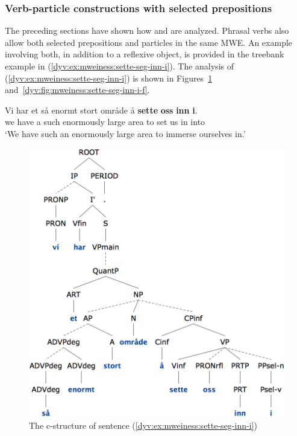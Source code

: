 \documentclass[output=paper]{langsci/langscibook}
\begin{document}
\subsubsection{Verb-particle constructions with selected prepositions}\label{dyv:sec:mweiness:prtprepverbs}

The preceding sections have shown how  and  are analyzed.
Phrasal verbs also allow both selected prepositions and particles in the same MWE.
An example involving both, in addition to a reflexive object, is provided in the treebank example in (\ref{dyv:ex:mweiness:sette-seg-inn-i}).
The analysis of (\ref{dyv:ex:mweiness:sette-seg-inn-i}) is shown in Figures~\ref{dyv:fig:mweiness:sette-seg-inn-i-c} and~\ref{dyv:fig:mweiness:sette-seg-inn-i-f}.

\ea\label{dyv:ex:mweiness:sette-seg-inn-i}
\gll Vi har et så enormt stort område å \textbf{sette} \textbf{oss} \textbf{inn} \textbf{i}.\\
     we have a such enormously large area to set us in into\\
\glt `We have such an enormously large area to immerse ourselves in.'
\z

\begin{figure}
  \includegraphics[height=.47\textheight]{figures/sette-seg-inn-i-c.png}
  \caption{The c-structure of sentence (\ref{dyv:ex:mweiness:sette-seg-inn-i})}
  \label{dyv:fig:mweiness:sette-seg-inn-i-c}
\end{figure}
\end{document}

